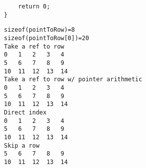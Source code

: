 \documentclass[11pt]{article}
\begin{document}
\begin{enumerate}
\begin{verbatim}
    return 0;   
}
\end{verbatim}

\begin{verbatim}
sizeof(pointToRow)=8
sizeof(pointToRow[0])=20
Take a ref to row
0	1	2	3	4	
5	6	7	8	9	
10	11	12	13	14	
Take a ref to row w/ pointer arithmetic
0	1	2	3	4	
5	6	7	8	9	
10	11	12	13	14	
Direct index
0	1	2	3	4	
5	6	7	8	9	
10	11	12	13	14	
Skip a row
5	6	7	8	9	
10	11	12	13	14
\end{verbatim}
\end{enumerate}
\end{document}
